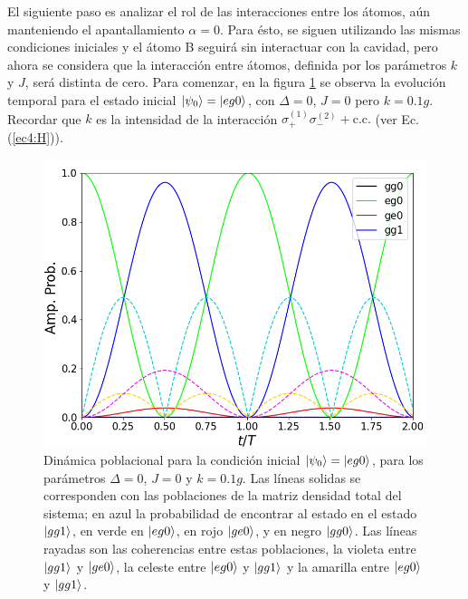 El siguiente paso es analizar el rol de las interacciones entre los átomos, aún manteniendo el apantallamiento $\alpha=0$. Para ésto, se siguen utilizando las mismas condiciones iniciales y el átomo B seguirá sin interactuar con la cavidad, pero ahora se considera que la interacción entre átomos, definida por los parámetros $k$ y $J$, será distinta de cero. Para comenzar, en la figura \ref{fig4:k eg0 abc} se observa la evolución temporal para el estado inicial $\ket{\psi_0}=\ket{eg0}$, con $\Delta = 0$, $J=0$ pero $k=0.1g$. Recordar que $k$ es la intensidad de la interacción $\sigma^{(1)}_+\sigma^{(2)}_-+\text{c.c.}$ (ver Ec. (\ref{ec4:H})).

\begin{figure}[h]
    \begin{minipage}[c]{0.67\textwidth}
        \includegraphics[width=\textwidth]{figuras/ch4/k eg0 ABC.png}
    \end{minipage}\hfill
    \begin{minipage}[c]{0.3\textwidth}
    \caption{Dinámica poblacional para la condición inicial $\ket{\psi_0}=\ket{eg0}$, para los parámetros $\Delta=0$, $J=0$ y $k=0.1g$. Las líneas solidas se corresponden con las poblaciones de la matriz densidad total del sistema; en azul la probabilidad de encontrar al estado en el estado $\ket{gg1}$, en verde en $\ket{eg0}$, en rojo $\ket{ge0}$, y en negro $\ket{gg0}$. Las líneas rayadas son las coherencias entre estas poblaciones, la violeta entre $\ket{gg1}$ y $\ket{ge0}$, la celeste entre $\ket{eg0}$ y $\ket{gg1}$ y la amarilla entre $\ket{eg0}$ y $\ket{gg1}$.
         } \label{fig4:k eg0 abc}
  \end{minipage}
\end{figure}
